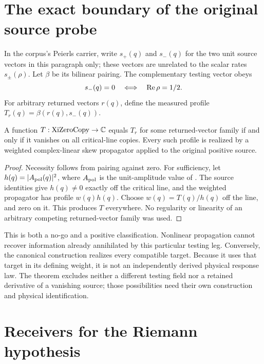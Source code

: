 \section{The exact boundary of the original source probe}

In the corpus's Peierls carrier, write \(s_+(q)\) and \(s_-(q)\) for the two unit source vectors in this paragraph only; these vectors are unrelated to the scalar rates \(s_\pm(\rho)\). Let \(\beta\) be its bilinear pairing. The complementary testing vector obeys
\[
 s_-(q)=0\quad\Longleftrightarrow\quad\operatorname{Re}\rho=1/2.
\]
For arbitrary returned vectors \(r(q)\), define the measured profile \(T_r(q)=\beta(r(q),s_-(q))\).

\begin{theorem}\label{thm:range}
A function \(T:\mathrm{XiZeroCopy}\to\mathbb C\) equals \(T_r\) for some returned-vector family if and only if it vanishes on all critical-line copies. Every such profile is realized by a weighted complex-linear skew propagator applied to the original positive source.
\end{theorem}
\begin{proof}
Necessity follows from pairing against zero. For sufficiency, let
\(h(q)=|A_{\rm pol}(q)|^2\), where \(A_{\rm pol}\) is the unit-amplitude value of .
The source identities give \(h(q)\ne0\) exactly off the critical line, and the weighted propagator has profile \(w(q)h(q)\). Choose \(w(q)=T(q)/h(q)\) off the line, and zero on it. This produces \(T\) everywhere. No regularity or linearity of an arbitrary competing returned-vector family was used.
\end{proof}

This is both a no-go and a positive classification. Nonlinear propagation cannot recover information already annihilated by this particular testing leg. Conversely, the canonical construction realizes every compatible target. Because it uses that target in its defining weight, it is not an independently derived physical response law. The theorem excludes neither a different testing field nor a retained derivative of a vanishing source; those possibilities need their own construction and physical identification.

\section{Receivers for the Riemann hypothesis}

